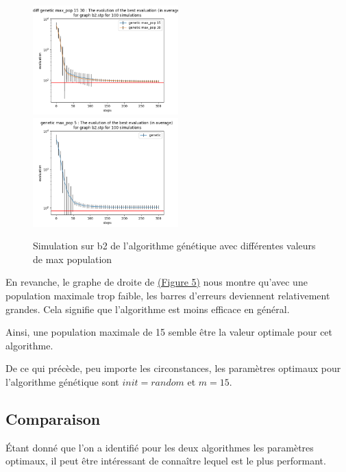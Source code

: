 \documentclass[11pt,french]{report}
\begin{document}
        \begin{figure}
          \includegraphics[width=0.5\textwidth]{best_b2_evaluation_diff genetic max_pop 15 30.png}
          \includegraphics[width=0.5\textwidth]{best_b2_evaluation_genetic max_pop 5.png}
          \caption{Simulation sur b2 de l'algorithme génétique avec différentes valeurs de max population}
          \label{Figure5}
        \end{figure}

        En revanche, le graphe de droite de \hyperref[Figure5]{(Figure 5)} nous montre qu'avec une population maximale trop faible, les barres d'erreurs deviennent relativement grandes. Cela signifie que l'algorithme est moins efficace en général.

        Ainsi, une population maximale de 15 semble être la valeur optimale pour cet algorithme.


        De ce qui précède, peu importe les circonstances, les paramètres optimaux pour l'algorithme génétique sont $init = random$ et $\hyperref[sélection]{m} = 15$.

        \subsection{Comparaison}
        Étant donné que l'on a identifié pour les deux algorithmes les paramètres optimaux, il peut être intéressant de connaître lequel est le plus performant.
\end{document}
